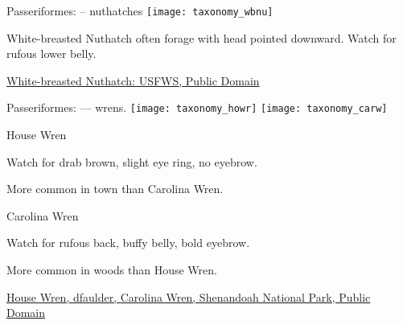 \documentclass[t]{beamer}
\newcommand{\backoneline}{\vspace{-\baselineskip}}
\begin{document}
%

\begin{frame}{Passeriformes:  – nuthatches}
	\texttt{[image: taxonomy\_wbnu]}
	
	White-breasted Nuthatch often forage with head pointed downward. Watch for rufous lower belly.
	
	\tinyfill \href{https://www.flickr.com/photos/43322816@N08/6869438631}{White-breasted Nuthatch: USFWS, Public Domain}
\end{frame}

%

\begin{frame}{Passeriformes:  — wrens.}
	\texttt{[image: taxonomy\_howr]}\hfill
	\texttt{[image: taxonomy\_carw]}
	
	\backoneline
	
	\begin{multicols}{2}
		House Wren
		
		\medskip
		
		Watch for drab brown, slight eye ring, no eyebrow.
		
		\smallskip
		
		More common in town than Carolina Wren.
		
		\columnbreak
		
		Carolina Wren
		
		\medskip
		
		Watch for rufous back, buffy belly, bold eyebrow.
		
		\smallskip
		
		More common in woods than House Wren.
	\end{multicols}	
	
	
	\vfilll
	
	\tiny
	
	\href{https://flickr.com/photos/dfaulder/14333805721}{House Wren, dfaulder, } \hfill 
	\href{https://flickr.com/photos/snpphotos/45449957822}{Carolina Wren, Shenandoah National Park, Public Domain}
	
	
\end{frame}

%
\end{document}
